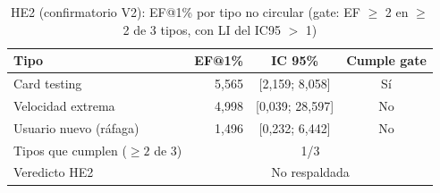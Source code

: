 \begin{table}[htbp]
\centering
\small
\caption{HE2 (confirmatorio V2): EF@1\% por tipo no circular (gate: EF $\geq$ 2 en $\geq$ 2 de 3 tipos, con LI del IC95 $>$ 1)}
\label{tab:v2-he2-ef-by-type}
\begin{tabular}{lrcc}
\toprule
Tipo & EF@1\% & IC 95\% & Cumple gate \\
\midrule
  Card testing & 5,565 & [2,159; 8,058] & Sí \\
  Velocidad extrema & 4,998 & [0,039; 28,597] & No \\
  Usuario nuevo (ráfaga) & 1,496 & [0,232; 6,442] & No \\
\midrule
  Tipos que cumplen ($\geq 2$ de 3) & \multicolumn{3}{c}{1/3} \\
  Veredicto HE2 & \multicolumn{3}{c}{No respaldada} \\
\bottomrule
\end{tabular}
\end{table}

